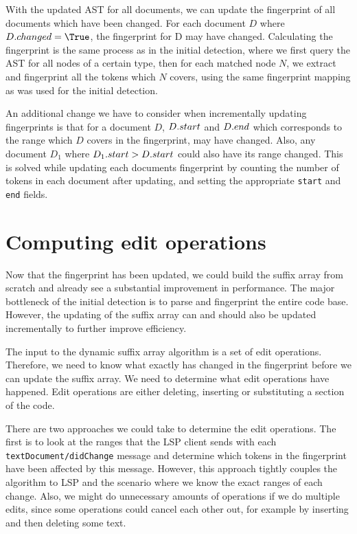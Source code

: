 With the updated AST for all documents, we can update the fingerprint of all documents
which have been changed. For each document $D$ where $\Access{D}{changed} = \True$, the
fingerprint for D may have changed. Calculating the fingerprint is the same process as in
the initial detection, where we first query the AST for all nodes of a certain type, then
for each matched node $N$, we extract and fingerprint all the tokens which $N$ covers,
using the same fingerprint mapping as was used for the initial detection.

An additional change we have to consider when incrementally updating fingerprints is that
for a document $D$, ${{D}.{start}}$ and ${{D}.{end}}$ which corresponds to the
range which $D$ covers in the fingerprint, may have changed. Also, any document $D_1$
where ${{D_1}.{start}} > {{D}.{start}}$ could also have its range changed. This is
solved while updating each documents fingerprint by counting the number of tokens in each
document after updating, and setting the appropriate \verb|start| and \verb|end| fields.



\section{Computing edit operations}

Now that the fingerprint has been updated, we could build the suffix array from scratch
and already see a substantial improvement in performance. The major bottleneck of the initial
detection is to parse and fingerprint the entire code base. However, the updating of the
suffix array can and should also be updated incrementally to further improve efficiency.

The input to the dynamic suffix array algorithm is a set of edit operations. Therefore, we
need to know what exactly has changed in the fingerprint before we can update the suffix
array. We need to determine what edit operations have happened. Edit operations are either
deleting, inserting or substituting a section of the code.

There are two approaches we could take to determine the edit operations. The first is to
look at the ranges that the LSP client sends with each \verb|textDocument/didChange|
message and determine which tokens in the fingerprint have been affected by this message.
However, this approach tightly couples the algorithm to LSP and the scenario where we know
the exact ranges of each change. Also, we might do unnecessary amounts of operations if we
do multiple edits, since some operations could cancel each other out, for example by
inserting and then deleting some text.

